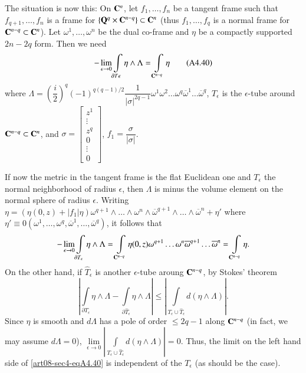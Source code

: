 The situation is now this: On $\mathbf{C}^{n}$, let $f_{1},\ldots,f_{n}$ be a tangent frame such that $f_{q+1},\ldots,f_{n}$ is a frame for $\{\mathbf{Q}^{q}\times \mathbf{C}^{n-q}\}\subset \mathbf{C}^{n}$ (thus $f_{1},\ldots,f_{q}$ is a normal frame for $\mathbf{C}^{n-q}\subset \mathbf{C}^{n}$). Let $\omega^{1},\ldots,\omega^{n}$ be the dual co-frame and $\eta$ be a compactly supported $2n-2q$ form. Then we need
\begin{equation*}
-\lim\limits_{\epsilon \to 0}\int\limits_{\partial T\epsilon}\eta \wedge \Lambda=\int\limits_{\mathbf{C}^{n-q}}\eta\tag{A4.40}\label{art08-sec4-eqA4.40}
\end{equation*}
where $\Lambda =\left(\dfrac{i}{2}\right)^{q}(-1)^{q(q-1)/2}\dfrac{1}{|\sigma|^{2q-1}}\omega^{1}\omega^{2}\ldots\omega^{q}\overline{\omega}^{1}\ldots\overline{\omega}^{q}$, $T_{\epsilon}$ is the $\epsilon$-tube around $\mathbf{C}^{n-q}\subset \mathbf{C}^{n}$, and $\sigma=\left[\begin{smallmatrix} z^{1}\\\vdots\\z^{q}\\0\\\vdots\\0\end{smallmatrix}\right]$, $f_{1}=\dfrac{\sigma}{|\sigma|}$.

If now the metric in the tangent frame is the flat Euclidean one and $T_{\epsilon}$ the normal neighborhood of radius $\epsilon$, then $\Lambda$ is minus the volume element on the normal sphere of radius $\epsilon$. Writing $\eta=(\eta(0,z)+|f_{1}|\widehat{\eta})\omega^{q+1}\wedge\ldots\wedge \omega^{n}\wedge \overline{\omega}^{q+1}\wedge\ldots\wedge\overline{\omega}^{n}+\eta'$ where $\eta'\equiv 0(\omega^{1},\ldots,\omega^{q},\overline{\omega}^{1},\ldots,\overline{\omega}^{q})$, it follows that
$$
-\lim\limits_{\epsilon\to 0}\int\limits_{\partial T_{\epsilon}}\eta \wedge \Lambda =\int\limits_{\mathbf{C}^{n-q}}\eta(0,z)\omega^{q+1}\ldots\omega^{n}\overline{\omega}^{q+1}\ldots\overline{\omega}^{n}=\int\limits_{\mathbf{C}^{n-q}}\eta.
$$ 
On the other hand, if $\widehat{T}_{\epsilon}$ is another $\epsilon$-tube aroung $\mathbf{C}^{n-q}$, by Stokes' theorem
$$
|\int\limits_{\partial T_{\epsilon}}\eta \wedge \Lambda-\int\limits_{\partial \widehat{T}_{\epsilon}}\eta \wedge \Lambda |\leq |\int\limits_{T_{\epsilon}\cup \widehat{T}_{\epsilon}}d(\eta\wedge\Lambda)|.
$$
Since $\eta$ is smooth and $d\Lambda$ has a pole of order $\leq 2q-1$ along $\mathbf{C}^{n-q}$ (in fact, we may assume $d\Lambda=0$), $\lim\limits_{\epsilon\to 0}|\int\limits_{T_{\epsilon}\cup \widehat{T}_{\epsilon}}d(\eta\wedge\Lambda)|=0$. Thus, the limit on the left hand side of \eqref{art08-sec4-eqA4.40} is independent of the $T_{\epsilon}$ (as should be the case).

